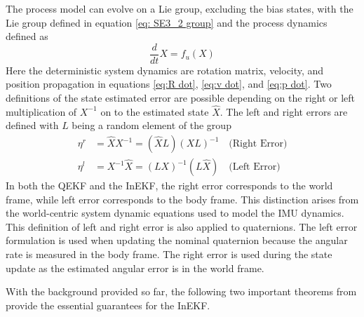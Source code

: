 The process model can evolve on a Lie group, excluding the bias states, with the Lie group defined in equation \eqref{eq: SE3_2 group} and the process dynamics defined as \cite{Contact-Aided_Invarant_EKF}
\begin{equation}
    \frac{d}{dt} X = f_{u}(X)
    \label{eq: X diff process model}
\end{equation}
Here the deterministic system dynamics are rotation matrix, velocity, and position propagation in equations \eqref{eq:R dot}, \eqref{eq:v dot}, and \eqref{eq:p dot}. Two definitions of the state estimated error are possible depending on the right or left multiplication of $X^{-1}$ on to the estimated state $\hat{X}$. The left and right errors are defined with $L$ being a random element of the group \cite{Contact-Aided_Invarant_EKF}
\begin{subequations}
    \begin{align}
        \eta^r &= \hat{X} X^{-1} = (\hat{X} L) (X L)^{-1} \quad \text{(Right Error)}\\
        \eta^l &= X^{-1} \hat{X} =  (L X)^{-1} (L \hat{X}) \quad \text{(Left Error)}
        \label{eq: left and right errors}
    \end{align}
\end{subequations}
In both the QEKF and the InEKF, the right error corresponds to the world frame, while left error corresponds to the body frame. This distinction arises from the world-centric system dynamic equations used to model the IMU dynamics. This definition of left and right error is also applied to quaternions. The left error formulation is used when updating the nominal quaternion because the angular rate is measured in the body frame. The right error is used during the state update as the estimated angular error is in the world frame. 

With the background provided so far, the following two important theorems from \cite{DBLP:journals/corr/BarrauB14} provide the essential guarantees for the InEKF.

